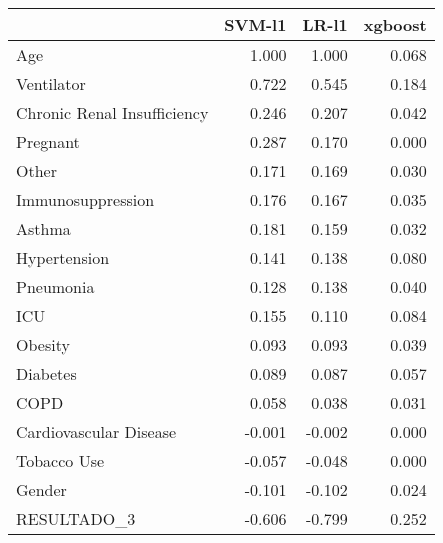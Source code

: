 \begin{tabular}{lrrr}
\toprule
{} &  SVM-l1 &  LR-l1 &  xgboost \\
\midrule
Age                         &   1.000 &  1.000 &    0.068 \\
Ventilator                  &   0.722 &  0.545 &    0.184 \\
Chronic Renal Insufficiency &   0.246 &  0.207 &    0.042 \\
Pregnant                    &   0.287 &  0.170 &    0.000 \\
Other                       &   0.171 &  0.169 &    0.030 \\
Immunosuppression           &   0.176 &  0.167 &    0.035 \\
Asthma                      &   0.181 &  0.159 &    0.032 \\
Hypertension                &   0.141 &  0.138 &    0.080 \\
Pneumonia                   &   0.128 &  0.138 &    0.040 \\
ICU                         &   0.155 &  0.110 &    0.084 \\
Obesity                     &   0.093 &  0.093 &    0.039 \\
Diabetes                    &   0.089 &  0.087 &    0.057 \\
COPD                        &   0.058 &  0.038 &    0.031 \\
Cardiovascular Disease      &  -0.001 & -0.002 &    0.000 \\
Tobacco Use                 &  -0.057 & -0.048 &    0.000 \\
Gender                      &  -0.101 & -0.102 &    0.024 \\
RESULTADO\_3                 &  -0.606 & -0.799 &    0.252 \\
\bottomrule
\end{tabular}
